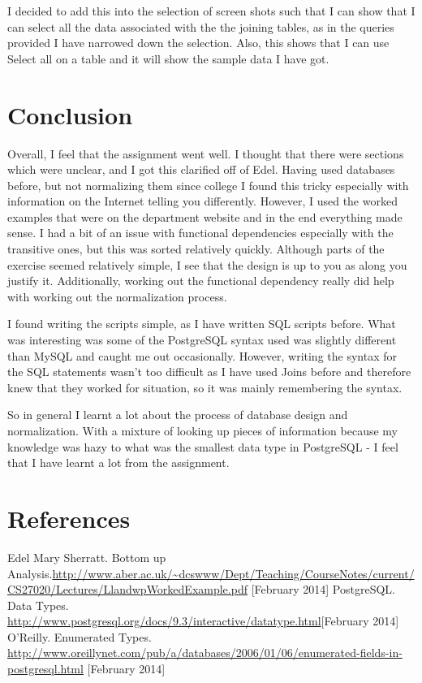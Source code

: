 \documentclass[12pt]{article}
\begin{document}
I decided to add this into the selection of screen shots such that I can show that I can select all the data associated with the the joining tables, as in the queries provided I have narrowed down the selection. Also, this shows that I can use Select all on a table and it will show the sample data I have got.
\newpage
\section {Conclusion}
Overall, I feel that the assignment went well. I thought that there were sections which were unclear, and I got this clarified off of Edel. Having used databases before, but not normalizing them since college I found this tricky especially with information on the Internet telling you differently. However, I used the worked examples that were on the department website and in the end everything made sense. I had a bit of an issue with functional dependencies especially with the transitive ones, but this was sorted relatively quickly. Although parts of the exercise seemed relatively simple, I see that the design is up to you as along you justify it. Additionally, working out the functional dependency really did help with working out the normalization process.

I found writing the scripts simple, as I have written SQL scripts before. What was interesting was some of the PostgreSQL syntax used was slightly different than MySQL and caught me out occasionally. However, writing the syntax for the SQL statements wasn't too difficult as I have used Joins before and therefore knew that they worked for situation, so it was mainly remembering the syntax.

So in general I learnt a lot about the process of database design and normalization. With a mixture of looking up pieces of information because my knowledge was hazy to what was the smallest data type in PostgreSQL - I feel that I have learnt a lot from the assignment.

\section {References} 
\begin{thebibliography}{}
Edel Mary Sherratt. Bottom up Analysis.\url{http://www.aber.ac.uk/~dcswww/Dept/Teaching/CourseNotes/current/CS27020/Lectures/LlandwpWorkedExample.pdf} [February 2014]
PostgreSQL. Data Types. \url{http://www.postgresql.org/docs/9.3/interactive/datatype.html}[February 2014]
O'Reilly. Enumerated Types. \url{http://www.oreillynet.com/pub/a/databases/2006/01/06/enumerated-fields-in-postgresql.html} [February 2014]
\end{thebibliography}
\end{document}
